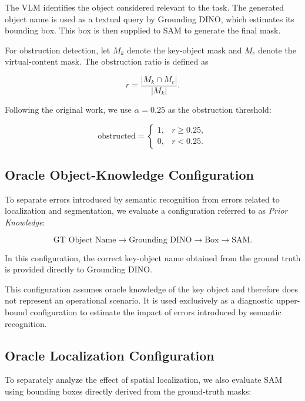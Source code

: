 \documentclass[conference]{IEEEtran}
\begin{document}
The VLM identifies the object considered relevant to the task. The generated object name is used as a textual query by Grounding DINO, which estimates its bounding box. This box is then supplied to SAM to generate the final mask.

For obstruction detection, let $M_k$ denote the key-object mask and $M_c$ denote the virtual-content mask. The obstruction ratio is defined as

\begin{equation}
r =
\frac{|M_k \cap M_c|}
{|M_k|}.
\end{equation}

Following the original work, we use $\alpha=0.25$ as the obstruction threshold:

\begin{equation}
\text{obstructed} =
\begin{cases}
1, & r \geq 0.25,\\
0, & r < 0.25.
\end{cases}
\end{equation}


\subsection{Oracle Object-Knowledge Configuration}

To separate errors introduced by semantic recognition from errors related to localization and segmentation, we evaluate a configuration referred to as \textit{Prior Knowledge}:

\begin{equation*}
\text{GT Object Name} \rightarrow
\text{Grounding DINO} \rightarrow
\text{Box} \rightarrow
\text{SAM}.
\end{equation*}

In this configuration, the correct key-object name obtained from the ground truth is provided directly to Grounding DINO.

This configuration assumes oracle knowledge of the key object and therefore does not represent an operational scenario. It is used exclusively as a diagnostic upper-bound configuration to estimate the impact of errors introduced by semantic recognition.


\subsection{Oracle Localization Configuration}

To separately analyze the effect of spatial localization, we also evaluate SAM using bounding boxes directly derived from the ground-truth masks:
\end{document}
